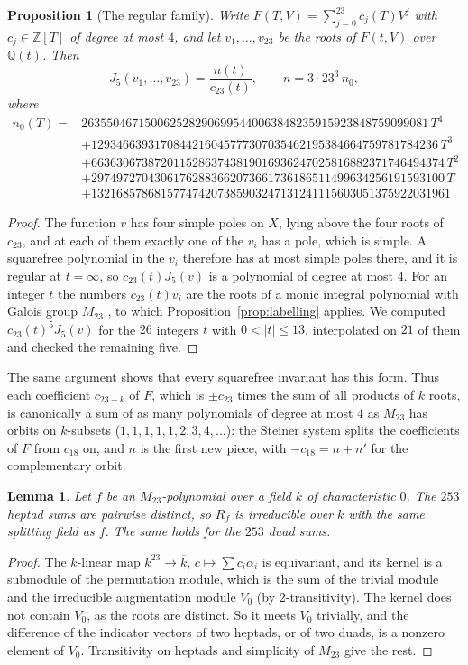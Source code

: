 \documentclass[11pt]{amsart}
\newtheorem{proposition}[theorem]{Proposition}
\newtheorem{lemma}[theorem]{Lemma}
\theoremstyle{definition}
\newcommand{\QQ}{\mathbb{Q}}
\newcommand{\ZZ}{\mathbb{Z}}
\newcommand{\M}{M_{23}}
\begin{document}
\begin{proposition}[The regular family]\label{prop:family}
Write $F(T,V)=\sum_{j=0}^{23}c_j(T)V^j$ with $c_j\in\ZZ[T]$ of degree at most $4$, and let $v_1,\dots,v_{23}$ be the roots of $F(t,V)$ over $\QQ(t)$. Then
\[
J_5(v_1,\dots,v_{23})=\frac{n(t)}{c_{23}(t)},\qquad n=3\cdot23^3\,n_0,
\]
where
\[
\scriptstyle
\begin{aligned}
n_0(T)={}&2635504671500625282906995440063848235915923848759099081\,T^4\\
&+ 1293466393170844216045777307035462195384664759781784236\,T^3\\
&+ 66363067387201152863743819016936247025816882371746494374\,T^2\\
&+ 29749727043061762883662073661736186511499634256191593100\,T\\
&+ 132168578681577474207385903247131241115603051375922031961
\end{aligned}
\]
\end{proposition}
\begin{proof}
The function $v$ has four simple poles on $X$, lying above the four roots of $c_{23}$, and at each of them exactly one of the $v_i$ has a pole, which is simple. A squarefree polynomial in the $v_i$ therefore has at most simple poles there, and it is regular at $t=\infty$, so $c_{23}(t)J_5(v)$ is a polynomial of degree at most $4$. For an integer $t$ the numbers $c_{23}(t)v_i$ are the roots of a monic integral polynomial with Galois group $\M$ \cite[Table~1]{HJLPPZ26}, to which Proposition~\ref{prop:labelling} applies. We computed $c_{23}(t)^5J_5(v)$ for the $26$ integers $t$ with $0<|t|\le13$, interpolated on $21$ of them and checked the remaining five.
\end{proof}

The same argument shows that every squarefree invariant has this form. Thus each coefficient $c_{23-k}$ of $F$, which is $\pm c_{23}$ times the sum of all products of $k$ roots, is canonically a sum of as many polynomials of degree at most $4$ as $\M$ has orbits on $k$-subsets ($1,1,1,1,1,2,3,4,\dots$): the Steiner system splits the coefficients of $F$ from $c_{18}$ on, and $n$ is the first new piece, with $-c_{18}=n+n'$ for the complementary orbit.

\begin{lemma}\label{lem:sums}
Let $f$ be an $\M$-polynomial over a field $k$ of characteristic $0$. The $253$ heptad sums are pairwise distinct, so $R_f$ is irreducible over $k$ with the same splitting field as $f$. The same holds for the $253$ duad sums.
\end{lemma}
\begin{proof}
The $k$-linear map $k^{23}\to\overline k$, $c\mapsto\sum c_i\alpha_i$ is equivariant, and its kernel is a submodule of the permutation module, which is the sum of the trivial module and the irreducible augmentation module $V_0$ (by $2$-transitivity). The kernel does not contain $V_0$, as the roots are distinct. So it meets $V_0$ trivially, and the difference of the indicator vectors of two heptads, or of two duads, is a nonzero element of $V_0$. Transitivity on heptads and simplicity of $\M$ give the rest.
\end{proof}
\end{document}
